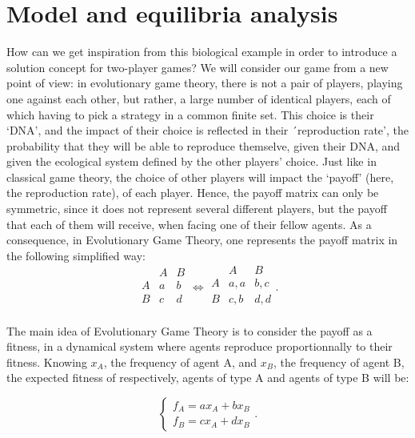 \section{Model and equilibria analysis}

How can we get inspiration from this biological example in order  to introduce a solution concept for two-player games?  We will consider our game from a new point of view: in evolutionary game theory, there is not a pair of players, playing one against each other, but rather, a large number of identical players, each of which having to pick a strategy in a common finite set.  This choice is their `DNA', and the impact of their choice is reflected in their ´reproduction rate', the probability that they will be able to reproduce themselve, given their DNA, and given the ecological system defined by the other players' choice.  Just like in classical game theory, the choice of other players will impact the `payoff' (here, the reproduction rate), of each player.  Hence, the payoff matrix can only be symmetric, since it does not represent several different players, but the payoff that each of them will receive, when facing one of their fellow agents. As a consequence, in Evolutionary Game Theory, one represents the payoff matrix in the following simplified way:
\begin{equation}
\begin{array}{l|cr}
 & A & B\\ 
\hline 
A & a & b\\ 
B & c & d\\
\end{array}
\Longleftrightarrow
\begin{array}{l|cr}
 & A & B\\ 
\hline 
A & a,a & b,c\\ 
B & c,b & d,d\\
\end{array}.
\label{payoff}
\end{equation}

The main idea of Evolutionary Game Theory is to consider the payoff as a fitness, in a dynamical system where agents reproduce proportionnally to their fitness.  Knowing $x_A$, the frequency of agent A, and $x_B$, the frequency of agent B, the expected fitness of respectively, agents of type A and agents of type B will be:

\begin{equation}
\begin{cases} 
f_A = a x_A + bx_B \\
f_B = cx_A + dx_B
\end{cases}.
\label{syst2}
\end{equation}

